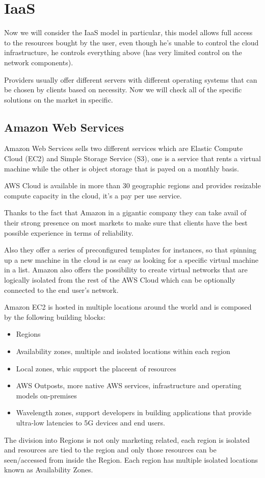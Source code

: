 \chapter{IaaS}
Now we will consider the IaaS model in particular, this model allows full access to the resources
bought by the user, even though he's unable to control the cloud infrastructure, he controls
everything above (has very limited control on the network components).

Providers usually offer different servers with different operating systems that can be chosen by clients based on necessity. Now we will check all of the specific solutions on the market in specific.

\section{Amazon Web Services}
Amazon Web Services sells two different services which are Elastic Compute Cloud (EC2) and Simple
Storage Service (S3), one is a service that rents a virtual machine while the other is object
storage that is payed on a monthly basis.

AWS Cloud is available in more than 30 geographic regions and provides resizable compute capacity in the cloud, it's a pay per use service.

Thanks to the fact that Amazon in a gigantic company they can take avail of their strong presence on most markets to make sure that clients have the best possible experience in terms of reliability.

Also they offer a series of preconfigured templates for instances, so that spinning up a new machine in the cloud is as easy as looking for a specific virtual machine in a list. Amazon also offers the possibility to create virtual networks that are logically isolated from the rest of the AWS Cloud which can be optionally connected to the end user's network.

Amazon EC2 is hosted in multiple locations around the world and is composed by the following building blocks:
\begin{itemize}
    \item Regions
    \item Availability zones, multiple and isolated locations within each region
    \item Local zones, whic support the placeent of resources
    \item AWS Outposts, more native AWS services, infrastructure and operating models on-premises
    \item Wavelength zones, support developers in building applications that provide ultra-low latencies to 5G devices and end users.
\end{itemize}
The division into Regions is not only marketing related, each region is isolated and resources are tied to the region and only those resources can be seen/accessed from inside the Region. Each region has multiple isolated locations known as Availability Zones.

